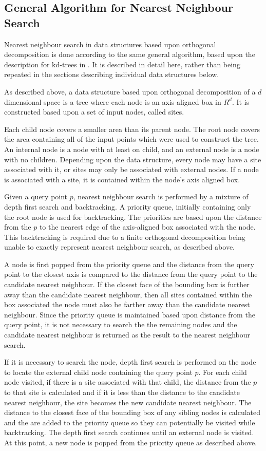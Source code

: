 \documentclass[mcs]{scsthesis}
\begin{document}
\subsection{General Algorithm for Nearest Neighbour Search}

Nearest neighbour search in data structures based upon orthogonal decomposition
is done according to the same general algorithm, based upon the description for
kd-trees in \cite{samet}. It is described in detail here, rather than being
repeated in the sections describing individual data structures below.

As described above, a data structure based upon orthogonal decomposition of
a $d$ dimensional space is a tree where each node is an axis-aligned box in
$R^d$. It is constructed based upon a set of input nodes, called sites.

Each child node covers a smaller area than its parent node. The root node
covers the area containing all of the input points which were used to construct
the tree. An internal node is a node with at least on child, and an external
node is a node with no children. Depending upon the data structure, every node
may have a site associated with it, or sites may only be associated with
external nodes. If a node is associated with a site, it is contained within the
node's axis aligned box.

Given a query point $p$, nearest neighbour search is performed by a mixture of
depth first search and backtracking. A priority queue, initially containing only
the root node is used for backtracking. The priorities are based upon the
distance from the $p$ to the nearest edge of the axis-aligned box associated
with the node. This backtracking is required due to a finite orthogonal
decomposition being unable to exactly represent nearest neighbour search, as
described above.

A node is first popped from the priority queue and the distance from the query
point to the closest axis is compared to the distance from the query point to
the candidate nearest neighbour. If the closest face of the bounding box is
further away than the candidate nearest neighbour, then all sites contained
within the box associated the node must also be farther away than the candidate
nearest neighbour. Since the priority queue is maintained based upon distance
from the query point, it is not necessary to search the the remaining nodes and
the candidate nearest neighbour is returned as the result to the nearest
neighbour search.

If it is necessary to search the node, depth first search is performed on the
node to locate the external child node containing the query point $p$. For each
child node visited, if there is a site associated with that child, the distance
from the $p$ to that site is calculated and if it is less than the distance to
the candidate nearest neighbour, the site becomes the new candidate nearest
neighbour. The distance to the closest face of the bounding box of any sibling
nodes is calculated and the are added to the priority queue so they can
potentially be visited while backtracking. The depth first search continues
until an external node is visited. At this point, a new node is popped from
the priority queue as described above.
\end{document}
